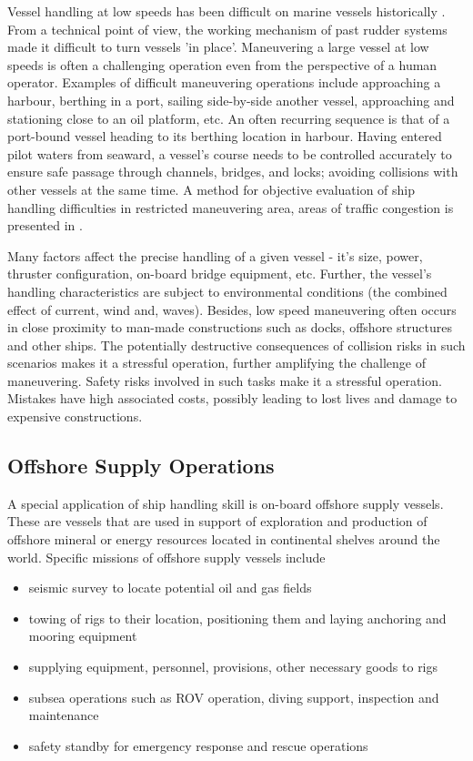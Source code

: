 Vessel handling at low speeds has been difficult on marine vessels historically \parencite{brittanica:ship}. From a technical point of view, the working mechanism of past rudder systems made it difficult to turn vessels 'in place'. Maneuvering a large vessel at low speeds is often a challenging operation even from the perspective of a human operator. Examples of difficult maneuvering operations include approaching a harbour, berthing in a port, sailing side-by-side another vessel, approaching and stationing close to an oil platform, etc. An often recurring sequence is that of a port-bound vessel heading to its berthing location in harbour. Having entered pilot waters from seaward, a vessel's course needs to be controlled accurately to ensure safe passage through channels, bridges, and locks; avoiding collisions with other vessels at the same time. A method for objective evaluation of ship handling difficulties in restricted maneuvering area, areas of traffic congestion is presented in \parencite{inoue2000evaluation}.

Many factors affect the precise handling of a given vessel - it's size, power, thruster configuration, on-board bridge equipment, etc. Further, the vessel's handling characteristics are subject to environmental conditions (the combined effect of current, wind and, waves). Besides, low speed maneuvering often occurs in close proximity to man-made constructions such as docks, offshore structures and other ships. The potentially destructive consequences of collision risks in such scenarios makes it a stressful operation, further amplifying the challenge of maneuvering. Safety risks involved in such tasks make it a stressful operation. Mistakes have high associated costs, possibly leading to lost lives and damage to expensive constructions.

\subsection{Offshore Supply Operations}

A special application of ship handling skill is on-board offshore supply vessels. These are vessels that are used in support of exploration and production of offshore mineral or energy resources located in continental shelves around the world. Specific missions of offshore supply vessels include 
\begin{itemize}\renewcommand{\labelitemi}{\tiny$\blacksquare$} 
\item seismic survey to locate potential oil and gas fields
\item towing of rigs to their location, positioning them and laying anchoring and mooring equipment
\item supplying equipment, personnel, provisions, other necessary goods to rigs
\item subsea operations such as ROV operation, diving support, inspection and maintenance
\item safety standby for emergency response and rescue operations
\end{itemize}

